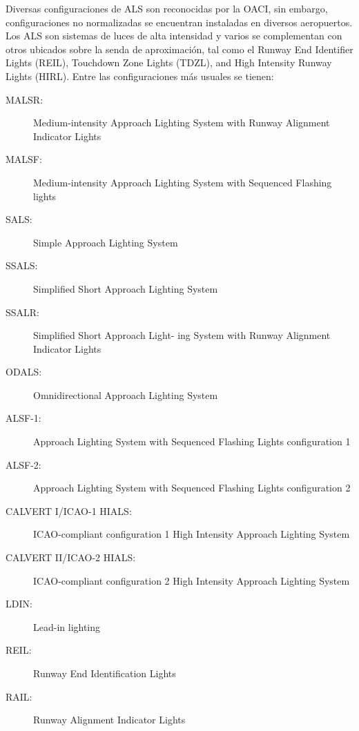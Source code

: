 Diversas configuraciones de ALS son reconocidas por la OACI, sin embargo, configuraciones no
normalizadas se encuentran instaladas en diversos aeropuertos. Los ALS son sistemas de luces de alta
intensidad y varios se complementan con otros ubicados sobre la senda de aproximación, tal como el
Runway End Identifier Lights (REIL), Touchdown Zone Lights (TDZL), and High Intensity Runway
Lights (HIRL). Entre las configuraciones más usuales se tienen:

{\footnotesize
\begin{description}
\item[MALSR:] Medium-intensity Approach
Lighting System with Runway Alignment
Indicator Lights

\item[MALSF:] Medium-intensity Approach
Lighting System with Sequenced Flashing
lights

\item[SALS:] Simple Approach Lighting System

\item[SSALS:] Simplified Short Approach Lighting System

\item[SSALR:] Simplified Short Approach Light-
ing System with Runway Alignment Indicator Lights

\item[ODALS:] Omnidirectional Approach Lighting System
  
\item[ALSF-1:] Approach Lighting System with
  Sequenced Flashing Lights configuration 1
  
\item[ALSF-2:] Approach Lighting System with
  Sequenced Flashing Lights configuration 2
  
\item[CALVERT I/ICAO-1 HIALS:] ICAO-compliant configuration 1 High Intensity
  Approach Lighting System
  
\item[CALVERT II/ICAO-2 HIALS:] ICAO-compliant configuration 2 High Intensity
  Approach Lighting System
  
\item[LDIN:] Lead-in lighting
  
\item[REIL:] Runway End Identification Lights

\item[RAIL:] Runway Alignment Indicator Lights

\end{description}
}

